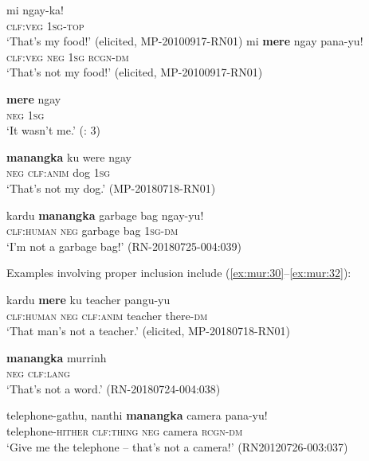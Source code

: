 \documentclass[output=paper,colorlinks,citecolor=brown]{langscibook}
\begin{document}
\ea\label{ex:mur:26}
    \ea\label{ex:mur:26a}
        \gll  mi ngay-ka!\\ 
              \textsc{clf:veg} \textsc{1sg-top}\\
        \glt ‘That’s my food!’ (elicited, MP-20100917-RN01)
    \ex\label{ex:mur:26b}
        \gll mi \textbf{mere} ngay pana-yu! \\
              \textsc{clf:veg} \textsc{neg} \textsc{1sg} \textsc{rcgn-dm}\\
        \glt ‘That’s not my food!’ (elicited, MP-20100917-RN01)
\z
\z 

\ea\label{ex:mur:27}
    \gll \textbf{mere} ngay\\
         \textsc{neg} \textsc{1sg}\\
    \glt ‘It wasn’t me.’ (\citealt{FordMcCormack2011}: 3)
\z 

\ea\label{ex:mur:28}
    \gll \textbf{manangka} ku were ngay \\
         \textsc{neg} \textsc{clf:anim} dog \textsc{1sg}\\
    \glt ‘That’s not my dog.’ (MP-20180718-RN01)
\z

\ea\label{ex:mur:29} 
    \gll kardu \textbf{manangka} {garbage} {bag} ngay-yu!\\ 
         \textsc{clf:human} \textsc{neg} garbage bag \textsc{1sg-dm}\\
    \glt ‘I’m not a garbage bag!’ (RN-20180725-004:039)
\z 

Examples involving proper inclusion include (\ref{ex:mur:30}--\ref{ex:mur:32}): 

\ea\label{ex:mur:30}
    \gll kardu \textbf{mere} ku teacher pangu-yu\\
          \textsc{clf:human} \textsc{neg} \textsc{clf:anim} teacher there-\textsc{dm}\\
    \glt ‘That man’s not a teacher.’ (elicited, MP-20180718-RN01) 
\z 

\ea\label{ex:mur:31}
    \gll  \textbf{manangka} murrinh\\
         \textsc{neg} \textsc{clf:lang}\\
    \glt ‘That’s not a word.’ (RN-20180724-004:038)
\z 

\ea\label{ex:mur:32} 
    \gll telephone-gathu, nanthi \textbf{manangka} camera pana-yu!\\
         telephone-\textsc{hither} \textsc{clf:thing} \textsc{neg} camera \textsc{rcgn-dm}\\
    \glt ‘Give me the telephone – that’s not a camera!’ (RN20120726-003:037)
\z
\end{document}
